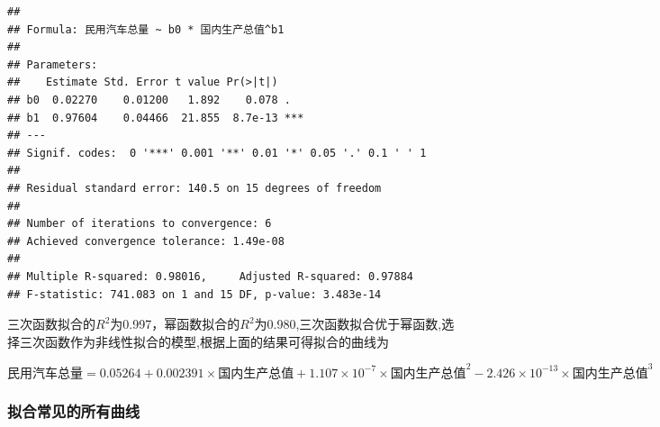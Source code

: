 \documentclass[
]{article}
\begin{document}
\begin{verbatim}
## 
## Formula: 民用汽车总量 ~ b0 * 国内生产总值^b1
## 
## Parameters:
##    Estimate Std. Error t value Pr(>|t|)    
## b0  0.02270    0.01200   1.892    0.078 .  
## b1  0.97604    0.04466  21.855  8.7e-13 ***
## ---
## Signif. codes:  0 '***' 0.001 '**' 0.01 '*' 0.05 '.' 0.1 ' ' 1
## 
## Residual standard error: 140.5 on 15 degrees of freedom
## 
## Number of iterations to convergence: 6 
## Achieved convergence tolerance: 1.49e-08
## 
## Multiple R-squared: 0.98016,     Adjusted R-squared: 0.97884 
## F-statistic: 741.083 on 1 and 15 DF, p-value: 3.483e-14
\end{verbatim}

三次函数拟合的\(R^2\)为0.997，幂函数拟合的\(R^2\)为0.980,三次函数拟合优于幂函数,选择三次函数作为非线性拟合的模型,根据上面的结果可得拟合的曲线为

\[
\text{民用汽车总量} = 0.05264 + 0.002391 \times \text{国内生产总值} + 1.107\times10^{-7} \times \text{国内生产总值}^2 - 2.426\times10^{-13} \times \text{国内生产总值}^3
\]

\subsubsection{拟合常见的所有曲线}\label{ux62dfux5408ux5e38ux89c1ux7684ux6240ux6709ux66f2ux7ebf}
\end{document}

